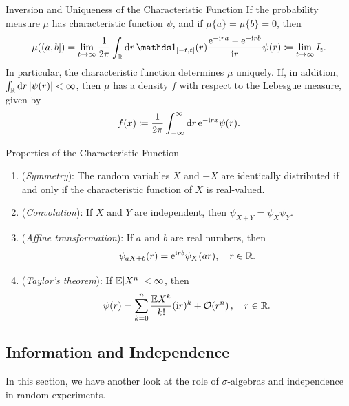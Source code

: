 \begin{thm}{Inversion and Uniqueness of the Characteristic Function}{}
	If the probability measure \(\mu\) has characteristic function \(\psi\), and if \(\mu\{a\} = \mu\{b\} = 0\), then
	\begin{equation}
		\mu((a, b]) = \lim_{t \to \infty} \frac{1}{2\pi} \int_{\R} \di r \, \I_{[-t, t]}(r) \frac{\e^{-\mathrm{i} r a} - \e^{-\mathrm{i} r b}}{\mathrm{i} r} \psi(r) \coloneqq \lim_{t \to \infty} I_t.
		\label{eq:CharacteristicFunctionInversion}
	\end{equation}
	In particular, the characteristic function determines \(\mu\) uniquely. If, in addition, \(\int_{\mathbb{R}} \mathrm{d} r \, |\psi(r)| < \infty\), then \(\mu\) has a density \(f\) with respect to the Lebesgue measure, given by
	\begin{equation}
		f(x) \coloneqq \frac{1}{2\pi} \int_{-\infty}^{\infty} \mathrm{d} r \, \mathrm{e}^{-\mathrm{i} r x} \psi(r).
		\label{eq:CharacteristicFunctionDensity}
	\end{equation}
\end{thm}

\begin{prop}{Properties of the Characteristic Function}{}
	\begin{enumerate}
		\item (\textit{Symmetry}): The random variables \(X\) and \(-X\) are identically distributed if and only if the characteristic function of \(X\) is real-valued.
		\item (\textit{Convolution}): If \(X\) and \(Y\) are independent, then \(\psi_{X+Y} = \psi_X \psi_Y\).
		\item (\textit{Affine transformation}): If \(a\) and \(b\) are real numbers, then
		      \begin{equation*}
			      \psi_{aX+b}(r) = \mathrm{e}^{\mathrm{i} r b} \psi_X(a r), \quad r \in \mathbb{R}.
		      \end{equation*}
		\item (\textit{Taylor's theorem}): If \(\mathbb{E} |X^n| < \infty\), then
		      \begin{equation*}
			      \psi(r) = \sum_{k=0}^n \frac{\mathbb{E} X^k}{k!} (\mathrm{i} r)^k + \mathcal{O}\!\left(r^n\right), \quad r \in \mathbb{R}.
		      \end{equation*}
	\end{enumerate}
\end{prop}

\subsection{Information and Independence}
In this section, we have another look at the role of \(\sigma\)-algebras and independence in random experiments.

